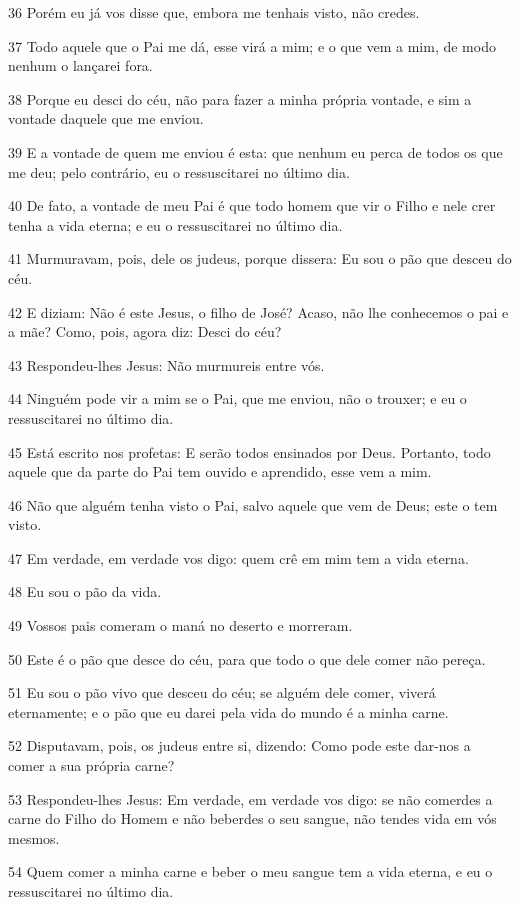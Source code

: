 \par 36 Porém eu já vos disse que, embora me tenhais visto, não credes.
\par 37 Todo aquele que o Pai me dá, esse virá a mim; e o que vem a mim, de modo nenhum o lançarei fora.
\par 38 Porque eu desci do céu, não para fazer a minha própria vontade, e sim a vontade daquele que me enviou.
\par 39 E a vontade de quem me enviou é esta: que nenhum eu perca de todos os que me deu; pelo contrário, eu o ressuscitarei no último dia.
\par 40 De fato, a vontade de meu Pai é que todo homem que vir o Filho e nele crer tenha a vida eterna; e eu o ressuscitarei no último dia.
\par 41 Murmuravam, pois, dele os judeus, porque dissera: Eu sou o pão que desceu do céu.
\par 42 E diziam: Não é este Jesus, o filho de José? Acaso, não lhe conhecemos o pai e a mãe? Como, pois, agora diz: Desci do céu?
\par 43 Respondeu-lhes Jesus: Não murmureis entre vós.
\par 44 Ninguém pode vir a mim se o Pai, que me enviou, não o trouxer; e eu o ressuscitarei no último dia.
\par 45 Está escrito nos profetas: E serão todos ensinados por Deus. Portanto, todo aquele que da parte do Pai tem ouvido e aprendido, esse vem a mim.
\par 46 Não que alguém tenha visto o Pai, salvo aquele que vem de Deus; este o tem visto.
\par 47 Em verdade, em verdade vos digo: quem crê em mim tem a vida eterna.
\par 48 Eu sou o pão da vida.
\par 49 Vossos pais comeram o maná no deserto e morreram.
\par 50 Este é o pão que desce do céu, para que todo o que dele comer não pereça.
\par 51 Eu sou o pão vivo que desceu do céu; se alguém dele comer, viverá eternamente; e o pão que eu darei pela vida do mundo é a minha carne.
\par 52 Disputavam, pois, os judeus entre si, dizendo: Como pode este dar-nos a comer a sua própria carne?
\par 53 Respondeu-lhes Jesus: Em verdade, em verdade vos digo: se não comerdes a carne do Filho do Homem e não beberdes o seu sangue, não tendes vida em vós mesmos.
\par 54 Quem comer a minha carne e beber o meu sangue tem a vida eterna, e eu o ressuscitarei no último dia.
